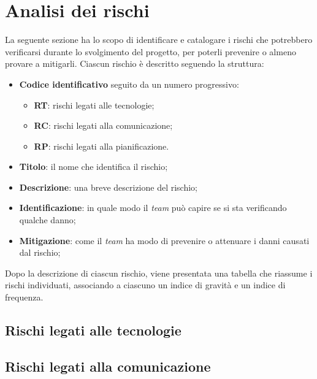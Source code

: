 \section{Analisi dei rischi}

La seguente sezione ha lo scopo di identificare e catalogare i rischi che
potrebbero verificarsi durante lo svolgimento del progetto, per poterli
prevenire o almeno provare a mitigarli.
Ciascun rischio è descritto seguendo la struttura:
\begin{itemize}
	\item \textbf{Codice identificativo} seguito da un numero progressivo:
	      \begin{itemize}
		      \item \textbf{RT}: rischi legati alle tecnologie;
		      \item \textbf{RC}: rischi legati alla comunicazione;
		      \item \textbf{RP}: rischi legati alla pianificazione.
	      \end{itemize}

	\item \textbf{Titolo}: il nome che identifica il rischio;

	\item \textbf{Descrizione}: una breve descrizione del rischio;

	\item \textbf{Identificazione}: in quale modo il \textit{team} può capire se
	      si sta verificando qualche danno;

	\item \textbf{Mitigazione}: come il \textit{team} ha modo di prevenire o
	      attenuare i danni causati dal rischio;
\end{itemize}

Dopo la descrizione di ciascun rischio, viene presentata una tabella che
riassume i rischi individuati, associando a ciascuno un indice di gravità e un
indice di frequenza.

\subsection{Rischi legati alle tecnologie}




\subsection{Rischi legati alla comunicazione}




